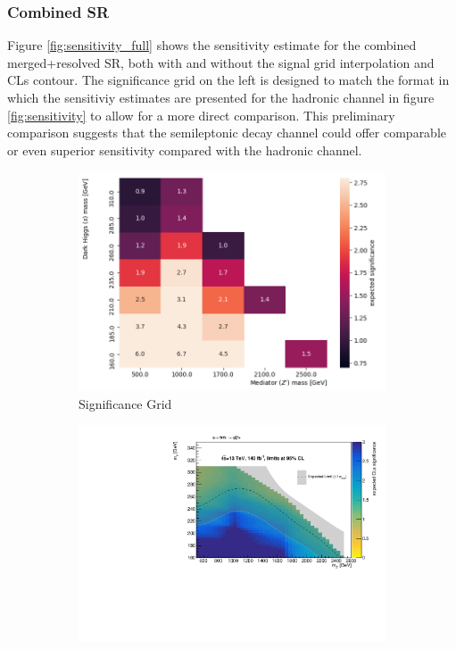\documentclass[12pt]{article}
\begin{document}
\subsubsection{Combined SR}

Figure \ref{fig:sensitivity_full} shows the sensitivity estimate for the combined merged+resolved SR, both with and without the signal grid interpolation and CLs contour. The significance grid on the left is designed to match the format in which the sensitiviy estimates are presented for the hadronic channel in figure \ref{fig:sensitivity} to allow for a more direct comparison. This preliminary comparison suggests that the semileptonic decay channel could offer comparable or even superior sensitivity compared with the hadronic channel. 

\begin{figure}[H]
     \centering
     \begin{subfigure}[b]{0.49\textwidth}
         \centering
         \includegraphics[width=\textwidth]{figures/semilep_sensitivity.png}
         \caption[]{Significance Grid}
         \label{fig:grid_sensitivity}
     \end{subfigure}
     \hfill
     \begin{subfigure}[b]{0.49\textwidth}
         \centering
         \includegraphics[width=\textwidth]{figures/exclude_combined_had_comparison.pdf}

\end{subfigure}
\end{figure}
\end{document}
